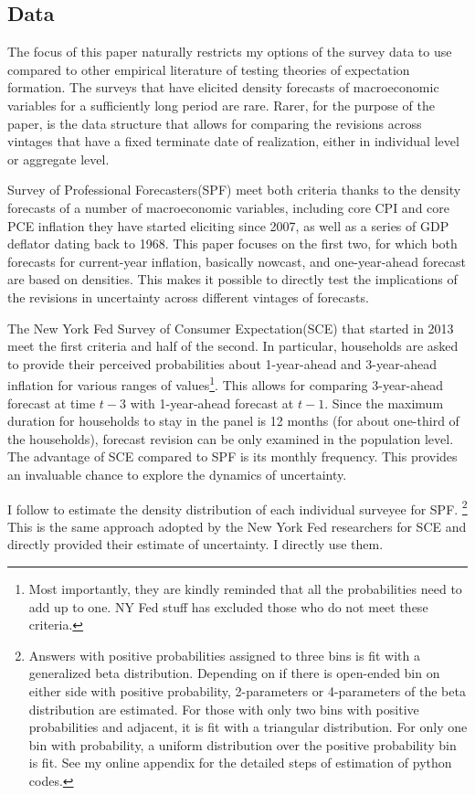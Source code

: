 \documentclass[12pt]{article}
\begin{document}
	\subsection{Data}
	
	The focus of this paper naturally restricts my options of the survey data to use compared to other empirical literature of testing theories of expectation formation.  The surveys that have elicited density forecasts of macroeconomic variables for a sufficiently long period are rare. Rarer, for the purpose of the paper, is the data structure that allows for comparing the revisions across vintages that have a fixed terminate date of realization, either in individual level or aggregate level. 
	
	Survey of Professional Forecasters(SPF) meet both criteria thanks to the density forecasts of a number of macroeconomic variables, including core CPI and core PCE inflation they have started eliciting since 2007, as well as a series of GDP deflator dating back to 1968. This paper focuses on the first two, for which both forecasts for current-year inflation, basically nowcast, and one-year-ahead forecast are based on densities. This makes it possible to directly test the implications of the revisions in uncertainty across different vintages of forecasts.   
	
	The New York Fed Survey of Consumer Expectation(SCE) that started in 2013 meet the first criteria and half of the second. In particular, households are asked to provide their perceived probabilities about 1-year-ahead and 3-year-ahead inflation for various ranges of values\footnote{Most importantly, they are kindly reminded that all the probabilities need to add up to one. NY Fed stuff has excluded those who do not meet these criteria.}. This allows for comparing 3-year-ahead forecast at time $t-3$ with 1-year-ahead forecast at $t-1$. Since the maximum duration for households to stay in the panel is 12 months (for about one-third of the households),  forecast revision can be only examined in the population level. The advantage of SCE compared to SPF is its monthly frequency. This provides an invaluable chance to explore the dynamics of uncertainty. 
	
	I follow \citet{engelberg2009comparing} to estimate the density distribution of each individual surveyee for SPF. \footnote{Answers with positive probabilities assigned to three bins is fit with a generalized beta distribution. Depending on if there is open-ended bin on either side with positive probability, 2-parameters or 4-parameters of the beta distribution are estimated. For those with only two bins with positive probabilities and adjacent, it is fit with a triangular distribution. For only one bin with probability, a uniform distribution over the positive probability bin is fit. See my online appendix for the detailed steps of estimation of python codes.} This is the same approach adopted by the New York Fed researchers \citet{armantier2017overview} for SCE and directly provided their estimate of uncertainty. I directly use them. 
	
\end{document}
